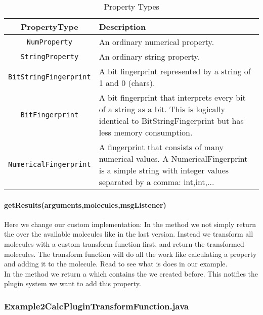     \begin{table}[!htb]
      \begin{tabular}{cp{10cm}}
	\textbf{PropertyType}	& \textbf{Description} \\ \toprule
	\verb+NumProperty+		& An ordinary numerical property.\\ \midrule
	\verb+StringProperty+	& An ordinary string property.\\ \midrule
	\verb+BitStringFingerprint+	& A bit fingerprint represented by a string of 1 and 0 (chars).\\ \midrule
	\verb+BitFingerprint+	& A bit fingerprint that interprets every bit of a string as a bit. This is logically identical to BitStringFingerprint but has less memory consumption.\\ \midrule
	\verb+NumericalFingerprint+	& A fingerprint that consists of many numerical values. A NumericalFingerprint is a simple string with integer values separated by a comma: int,int,...\\ \bottomrule
      \end{tabular}
      \caption{Property Types}
      \label{Table:scaffoldhunter:calc:PropertyType}
    \end{table}

    \paragraph{getResults(arguments,molecules,msgListener)} \label{sec:scaffoldhunter:calc:Example2CalcPlugin.java:getResults}
    Here we change our custom  implementation:
    In the  method we not simply return the  over the available molecules like in the last version.
    Instead we transform all molecules with a custom transform function first, and return the transformed molecules.
    The transform function will do all the work like calculating a property and adding it to the molecule.
    Read  to see what is does in our example.\\
    In the  method we return a  which contains the  we created before.
    This notifies the plugin system we want to add this property.

  \subsubsection{Example2CalcPluginTransformFunction.java} \label{sec:scaffoldhunter:calc:Example2CalcPluginTransformFunction.java}

